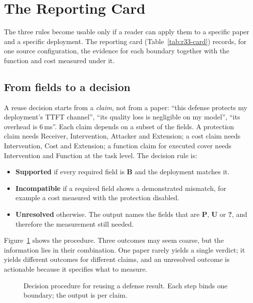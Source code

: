 \section{The Reporting Card}\label{sec:card}\label{sec:methodology}
The three rules become usable only if a reader can apply them to a specific paper and a specific deployment. The reporting card (Table~\ref{tab:r33-card}) records, for one source configuration, the evidence for each boundary together with the function and cost measured under it.



\subsection{From fields to a decision}
A reuse decision starts from a \emph{claim}, not from a paper: ``this defense protects my deployment's TTFT channel'', ``its quality loss is negligible on my model'', ``its overhead is 6\,ms''. Each claim depends on a subset of the fields. A protection claim needs Receiver, Intervention, Attacker and Extension; a cost claim needs Intervention, Cost and Extension; a function claim for executed cover needs Intervention and Function at the task level. The decision rule is:
\begin{itemize}
\item \textbf{Supported} if every required field is \textbf{B} and the deployment matches it.
\item \textbf{Incompatible} if a required field shows a demonstrated mismatch, for example a cost measured with the protection disabled.
\item \textbf{Unresolved} otherwise. The output names the fields that are \textbf{P}, \textbf{U} or \textbf{?}, and therefore the measurement still needed.
\end{itemize}
Figure~\ref{fig:main-decision} shows the procedure. Three outcomes may seem coarse, but the information lies in their combination. One paper rarely yields a single verdict; it yields different outcomes for different claims, and an unresolved outcome is actionable because it specifies what to measure.

\begin{figure}[t]\centering

\caption{Decision procedure for reusing a defense result. Each step binds one boundary; the output is per claim.}\label{fig:main-decision}
\end{figure}

